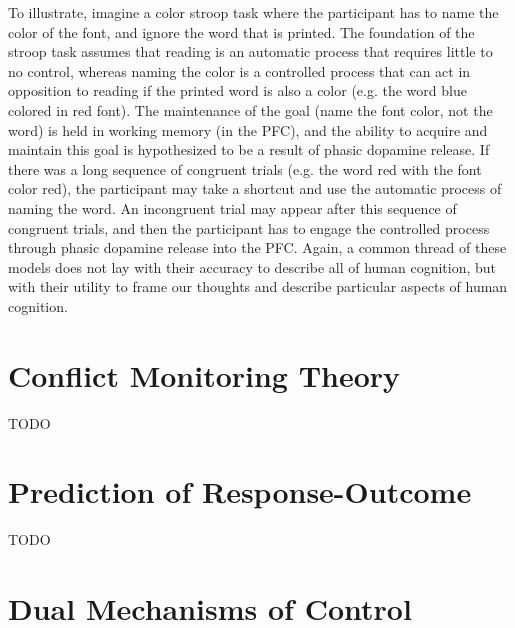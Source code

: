\documentclass[phd,appendix,figures]{uithesis}
\begin{document}
To illustrate, imagine a color stroop task where the participant has to name the color of the font, and ignore the word that is printed.
The foundation of the stroop task assumes that reading is an automatic process that requires little to no control, whereas naming the color is a controlled process that can act in opposition to reading if the printed word is also a color (e.g. the word blue colored in red font).
The maintenance of the goal (name the font color, not the word) is held in working memory (in the PFC), and the ability to acquire and maintain this goal is hypothesized to be a result of phasic dopamine release. 
If there was a long sequence of congruent trials (e.g. the word red with the font color red), the participant may take a shortcut and use the automatic process of naming the word.
An incongruent trial may appear after this sequence of congruent trials, and then the participant has to engage the controlled process through phasic dopamine release into the PFC.
Again, a common thread of these models does not lay with their accuracy to describe all of human cognition, but with their utility to frame our thoughts and describe particular aspects of human cognition. 

\section{Conflict Monitoring Theory}
TODO
\section{Prediction of Response-Outcome}
TODO

\section{Dual Mechanisms of Control}
\end{document}
